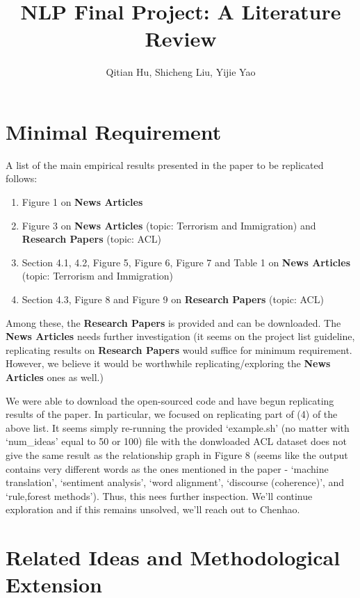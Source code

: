 \documentclass{article}
\title{NLP Final Project: A Literature Review}
\author{Qitian Hu, Shicheng Liu, Yijie Yao}
\begin{document}
\maketitle 

\section{Minimal Requirement}

A list of the main empirical results presented in the paper to be replicated
\cite{original} follows:

\begin{enumerate}
  \item Figure 1 on \textbf{News Articles}
  \item Figure 3 on \textbf{News Articles} (topic: Terrorism and Immigration)
   and \textbf{Research Papers} (topic: ACL)
  \item Section 4.1, 4.2, Figure 5, Figure 6, Figure 7 and Table 1 on 
  \textbf{News Articles} (topic: Terrorism and Immigration)
  \item Section 4.3, Figure 8 and Figure 9 on \textbf{Research Papers} 
  (topic: ACL)
\end{enumerate}

Among these, the \textbf{Research Papers} is provided and can be downloaded. 
The \textbf{News Articles} needs further investigation (it seems on the 
project list guideline, replicating results on \textbf{Research Papers}
would suffice for minimum requirement. However, we believe it would be
worthwhile replicating/exploring the \textbf{News Articles} ones as well.)

We were able to download the open-sourced code and have begun replicating
results of the paper. In particular, we focused on replicating part of (4)
of the above list. It seems simply re-running the provided `example.sh'
(no matter with `num\_ideas' equal to 50 or 100)
file with the donwloaded ACL dataset does not give the same result as the
relationship graph in Figure 8 (seems like the output contains very different
words as the ones mentioned in the paper - `machine translation', 
`sentiment analysis', `word alignment', `discourse (coherence)', and 
`rule,forest methods'). Thus, this nees further inspection. We'll continue
exploration and if this remains unsolved, we'll reach out to Chenhao.

\section{Related Ideas and Methodological Extension}
\end{document}
